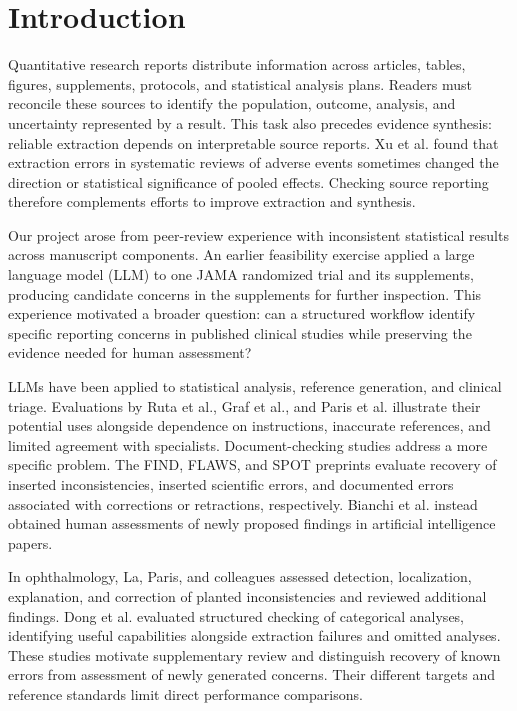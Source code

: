 \section{Introduction}
Quantitative research reports distribute information across articles, tables, figures, supplements, protocols, and statistical analysis plans. Readers must reconcile these sources to identify the population, outcome, analysis, and uncertainty represented by a result. This task also precedes evidence synthesis: reliable extraction depends on interpretable source reports. Xu et al. found that extraction errors in systematic reviews of adverse events sometimes changed the direction or statistical significance of pooled effects.\cite{xu2022extraction} Checking source reporting therefore complements efforts to improve extraction and synthesis.

Our project arose from peer-review experience with inconsistent statistical results across manuscript components. An earlier feasibility exercise applied a large language model (LLM) to one JAMA randomized trial and its supplements, producing candidate concerns in the supplements for further inspection. This experience motivated a broader question: can a structured workflow identify specific reporting concerns in published clinical studies while preserving the evidence needed for human assessment?

LLMs have been applied to statistical analysis, reference generation, and clinical triage. Evaluations by Ruta et al., Graf et al., and Paris et al. illustrate their potential uses alongside dependence on instructions, inaccurate references, and limited agreement with specialists.\cite{ruta2025statistics,graf2024referencing,paris2026triage} Document-checking studies address a more specific problem. The FIND, FLAWS, and SPOT preprints evaluate recovery of inserted inconsistencies, inserted scientific errors, and documented errors associated with corrections or retractions, respectively.\cite{lovering2025find,xi2025flaws,son2025spot} Bianchi et al. instead obtained human assessments of newly proposed findings in artificial intelligence papers.\cite{bianchi2025errors}

In ophthalmology, La, Paris, and colleagues assessed detection, localization, explanation, and correction of planted inconsistencies and reviewed additional findings.\cite{la2026consistency} Dong et al. evaluated structured checking of categorical analyses, identifying useful capabilities alongside extraction failures and omitted analyses.\cite{dong2026statistical} These studies motivate supplementary review and distinguish recovery of known errors from assessment of newly generated concerns. Their different targets and reference standards limit direct performance comparisons.

